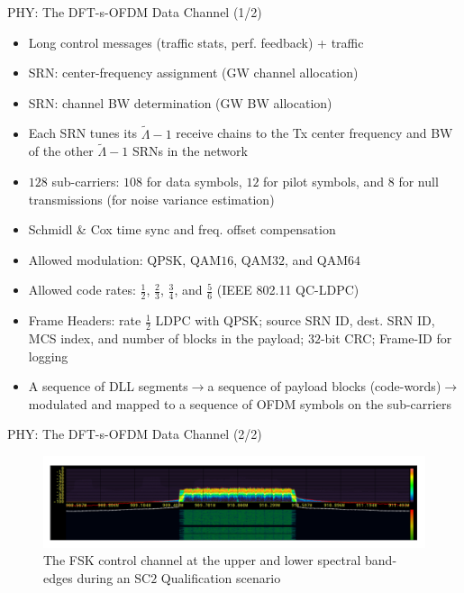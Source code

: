 \documentclass{beamer}
\begin{document}
\begin{frame}{PHY: The DFT-s-OFDM Data Channel (1/2)}
    \footnotesize{\begin{itemize}
        \item Long control messages (traffic stats, perf. feedback) + traffic
        \item SRN: center-frequency assignment (GW channel allocation)
        \item SRN: channel BW determination (GW BW allocation)
        \item Each SRN tunes its $\tilde{\Lambda}{-}1$ receive chains to the Tx center frequency and BW of the other $\tilde{\Lambda}{-}1$ SRNs in the network
        \item $128$ sub-carriers: $108$ for data symbols, $12$ for pilot symbols, and $8$ for null transmissions (for noise variance estimation)
        \item Schmidl \& Cox time sync and freq. offset compensation
        \item Allowed modulation: QPSK, QAM$16$, QAM$32$, and QAM$64$
        \item Allowed code rates: $\frac{1}{2}$, $\frac{2}{3}$, $\frac{3}{4}$, and $\frac{5}{6}$ (IEEE 802.11 QC-LDPC)
        \item Frame Headers: rate $\frac{1}{2}$ LDPC with QPSK; source SRN ID, dest. SRN ID, MCS index, and number of blocks in the payload; $32$-bit CRC; Frame-ID for logging
        \item A sequence of DLL segments$\longrightarrow$a sequence of payload blocks (code-words)$\longrightarrow$modulated and mapped to a sequence of OFDM symbols on the sub-carriers
    \end{itemize}}
\end{frame}
\begin{frame}{PHY: The DFT-s-OFDM Data Channel (2/2)}
\begin{figure}
    \centering
    \includegraphics[width = 1.0\textwidth]{Data_Channel_DFT-spread-OFDM_Power_Spectrum.PNG}
    \caption{The FSK control channel at the upper and lower spectral band-edges during an SC$2$ Qualification scenario}
    \label{fig:6}
\end{figure}
\end{frame}
\end{document}
